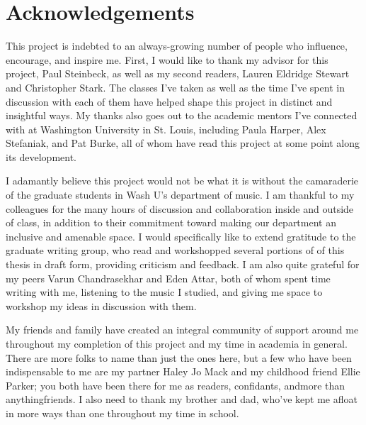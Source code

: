 \documentclass[12pt]{report}
\begin{document}
\thispagestyle{empty}

\frenchspacing

\setcounter{page}{2}
    \tableofcontents
    \listoffigures
    \listoftables

    \chapter*{Acknowledgements}

This project is indebted to an always-growing number of people who influence, encourage, and inspire me. First, I would like to thank my advisor for this project, Paul Steinbeck, as well as my second readers, Lauren Eldridge Stewart and Christopher Stark. The classes I've taken as well as the time I've spent in discussion with each of them have helped shape this project in distinct and insightful ways. My thanks also goes out to the academic mentors I've connected with at Washington University in St. Louis, including Paula Harper, Alex Stefaniak, and Pat Burke, all of whom have read this project at some point along its development.
 
I adamantly believe this project would not be what it is without the camaraderie of the graduate students in Wash U's department of music. I am thankful to my colleagues for the many hours of discussion and collaboration inside and outside of class, in addition to their commitment toward making our department an inclusive and amenable space. I would specifically like to extend gratitude to the graduate writing group, who read and workshopped several portions of of this thesis in draft form, providing criticism and feedback. I am also quite grateful for my peers Varun Chandrasekhar and Eden Attar, both of whom spent time writing with me, listening to the music I studied, and giving me space to workshop my ideas in discussion with them.

My friends and family have created an integral community of support around me throughout my completion of this project and my time in academia in general. There are more folks to name than just the ones here, but a few who have been indispensable to me are my partner Haley Jo Mack and my childhood friend Ellie Parker; you both have been there for me as readers, confidants, and\textemdash more than anything\textemdash friends. I also need to thank my brother and dad, who've kept me afloat in more ways than one throughout my time in school. 
\end{document}
